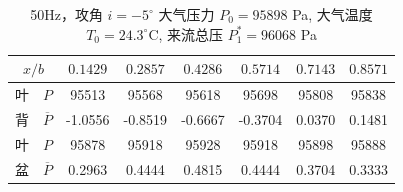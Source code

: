\begin{table}[H]
  \centering
  \caption[50Hz 攻角 $i=-5^\circ$ 实验数据]{50Hz，攻角 $i=-5^\circ$ 大气压力 $P_0=95898$ Pa, 大气温度 $T_0=24.3^\circ\text{C}$, 来流总压 $P_1^*=96068$ Pa}
  \label{tab:exp4_50Hz_-5}
  \renewcommand{\arraystretch}{1.2}
  \begin{tabular}{cccccccc}
    \toprule
    \multicolumn{2}{c}{$x/b$} & $0.1429$ & $0.2857$ & $0.4286$ & $0.5714$ & $0.7143$ & $0.8571$ \\
    \midrule
    叶 & $P$ & 95513 & 95568 & 95618 & 95698 & 95808 & 95838 \\
    背 & $\overline{P}$ & -1.0556 & -0.8519 & -0.6667 & -0.3704 & 0.0370 & 0.1481 \\
    \midrule
    叶 & $P$ & 95878 & 95918 & 95928 & 95918 & 95898 & 95888 \\
    盆 & $\overline{P}$ & 0.2963 & 0.4444 & 0.4815 & 0.4444 & 0.3704 & 0.3333 \\
    \bottomrule
  \end{tabular}
\end{table}